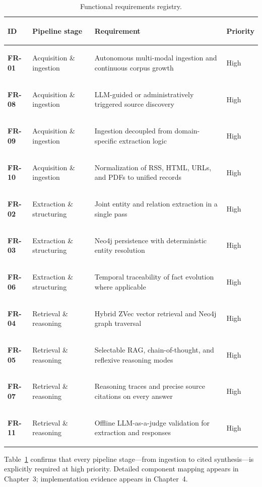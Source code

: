 \begin{table}[H]
\centering
\small
\setlength{\tabcolsep}{5pt}
\renewcommand{\arraystretch}{1.35}
\begin{tabularx}{\textwidth}{@{}>{\bfseries\raggedright\arraybackslash}p{1.25cm}>{\raggedright\arraybackslash}p{2.65cm}>{\raggedright\arraybackslash}X>{\centering\arraybackslash}p{1.55cm}@{}}
\toprule
\rowcolor{lightblue}
ID & Pipeline stage & Requirement & Priority \\
\midrule
\textbf{FR-01} & Acquisition \& ingestion & Autonomous multi-modal ingestion and continuous corpus growth & High \\
\textbf{FR-08} & Acquisition \& ingestion & LLM-guided or administratively triggered source discovery & High \\
\textbf{FR-09} & Acquisition \& ingestion & Ingestion decoupled from domain-specific extraction logic & High \\
\textbf{FR-10} & Acquisition \& ingestion & Normalization of RSS, HTML, URLs, and PDFs to unified records & High \\
\textbf{FR-02} & Extraction \& structuring & Joint entity and relation extraction in a single pass & High \\
\textbf{FR-03} & Extraction \& structuring & Neo4j persistence with deterministic entity resolution & High \\
\textbf{FR-06} & Extraction \& structuring & Temporal traceability of fact evolution where applicable & High \\
\textbf{FR-04} & Retrieval \& reasoning & Hybrid ZVec vector retrieval and Neo4j graph traversal & High \\
\textbf{FR-05} & Retrieval \& reasoning & Selectable RAG, chain-of-thought, and reflexive reasoning modes & High \\
\textbf{FR-07} & Retrieval \& reasoning & Reasoning traces and precise source citations on every answer & High \\
\textbf{FR-11} & Retrieval \& reasoning & Offline LLM-as-a-judge validation for extraction and responses & High \\
\bottomrule
\end{tabularx}
\caption{Functional requirements registry.}
\label{tab:functional-requirements}
\end{table}

Table~\ref{tab:functional-requirements} confirms that every pipeline stage---from ingestion to cited synthesis---is explicitly required at high priority. Detailed component mapping appears in Chapter~3; implementation evidence appears in Chapter~4.

